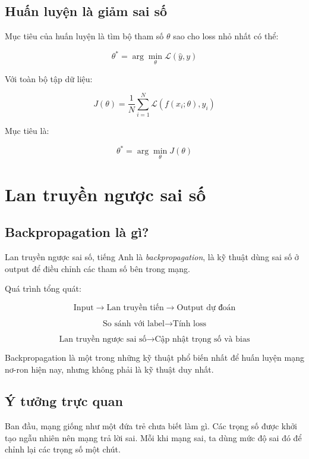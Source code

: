 \subsection{Huấn luyện là giảm sai số}

Mục tiêu của huấn luyện là tìm bộ tham số $\theta$ sao cho loss nhỏ nhất có thể:

\[
    \theta^* = \arg\min_{\theta} \mathcal{L}(\hat{y},y)
\]

Với toàn bộ tập dữ liệu:

\[
    J(\theta)=\frac{1}{N}\sum_{i=1}^{N}\mathcal{L}\left(f(x_i;\theta),y_i\right)
\]

Mục tiêu là:

\[
    \theta^* = \arg\min_{\theta} J(\theta)
\]

\section{Lan truyền ngược sai số}

\subsection{Backpropagation là gì?}

Lan truyền ngược sai số, tiếng Anh là \textit{backpropagation}, là kỹ thuật dùng sai số ở output để điều chỉnh các tham số bên trong mạng.

Quá trình tổng quát:

\[
    \text{Input} \rightarrow \text{Lan truyền tiến} \rightarrow \text{Output dự đoán}
\]

\[
    \text{So sánh với label} \rightarrow \text{Tính loss}
\]

\[
    \text{Lan truyền ngược sai số} \rightarrow \text{Cập nhật trọng số và bias}
\]

\begin{ghinho}
Backpropagation là một trong những kỹ thuật phổ biến nhất để huấn luyện mạng nơ-ron hiện nay, nhưng không phải là kỹ thuật duy nhất.
\end{ghinho}

\subsection{Ý tưởng trực quan}

Ban đầu, mạng giống như một đứa trẻ chưa biết làm gì. Các trọng số được khởi tạo ngẫu nhiên nên mạng trả lời sai. Mỗi khi mạng sai, ta dùng mức độ sai đó để chỉnh lại các trọng số một chút.

